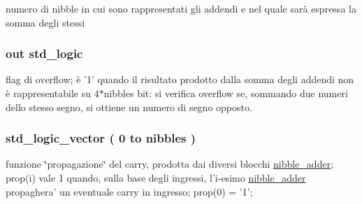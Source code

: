 numero di nibble in cui sono rappresentati gli addendi e nel quale sarà espressa la somma degli stessi 

\hypertarget{group___carry_loockahead_ga9650307dde287e0bcfa1e26370c006c2}{
\subsubsection[{overflow}]{ {\bfseries \textcolor{vhdlchar}{out}\textcolor{vhdlchar}{ }} {\bfseries \textcolor{vhdlchar}{std\+\_\+logic}\textcolor{vhdlchar}{ }} \hspace{0.3cm}{\ttfamily [Port]}}}\label{group___carry_loockahead_ga9650307dde287e0bcfa1e26370c006c2}


flag di overflow; è '1' quando il risultato prodotto dalla somma degli addendi non è rappresentabile su 4$\ast$nibbles bit\+: si verifica overflow se, sommando due numeri dello stesso segno, si ottiene un numero di segno opposto. 

\hypertarget{group___carry_loockahead_ga19afe0b89973d7fc29362431f2e828b7}{
\subsubsection[{prop}]{ {\bfseries \textcolor{vhdlchar}{std\+\_\+logic\+\_\+vector}\textcolor{vhdlchar}{ }\textcolor{vhdlchar}{(}\textcolor{vhdlchar}{ }\textcolor{vhdlchar}{ } \textcolor{vhdldigit}{0} \textcolor{vhdlchar}{ }\textcolor{vhdlchar}{to}\textcolor{vhdlchar}{ }\textcolor{vhdlchar}{ }\textcolor{vhdlchar}{ }\textcolor{vhdlchar}{ }{\bfseries {\bf nibbles}} \textcolor{vhdlchar}{ }\textcolor{vhdlchar}{)}\textcolor{vhdlchar}{ }} \hspace{0.3cm}{\ttfamily [Signal]}}}\label{group___carry_loockahead_ga19afe0b89973d7fc29362431f2e828b7}


funzione \char`\"{}propagazione\char`\"{} del carry, prodotta dai diversi blocchi \hyperlink{classnibble__adder}{nibble\+\_\+adder}; prop(i) vale 1 quando, sulla base degli ingressi, l'i-\/esimo \hyperlink{classnibble__adder}{nibble\+\_\+adder} propaghera' un eventuale carry in ingresso; prop(0) = '1'; 

